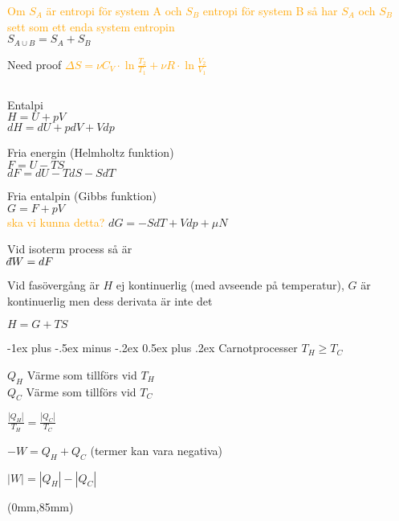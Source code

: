 \documentclass[10pt,landscape]{article}
\makeatletter
\renewcommand{\section}{\@startsection{section}{1}{0mm}%
                                {-1ex plus -.5ex minus -.2ex}%
                                {0.5ex plus .2ex}%
                                {\normalfont\large\bfseries}
                                }
\def\dbar{{\mathchar'26\mkern-12mu d}}
\makeatother
\begin{document}
\begin{multicols}{5}
\textcolor{orange}{Om $S_A$ är entropi för system A och $S_B$ entropi för system B så har
$S_A$ och $S_B$ sett som ett enda system entropin}\\
$S_{A \cup B} = S_A + S_B$

Need proof
\textcolor{orange}{
$\Delta S = \nu C_V \cdot \ln \frac{T_2}{T_1} + \nu R \cdot \ln \frac{V_2}{V_1}$
}

$$$$

Entalpi\\
$H = U + pV$\\
$dH = dU + pdV + Vdp$

Fria energin (Helmholtz funktion)\\
$F = U -TS$\\
$dF = dU - TdS - SdT$

Fria entalpin (Gibbs funktion)\\
$G = F + pV$\\
\textcolor{orange}{ska vi kunna detta?}
$dG = -SdT + Vdp + \mu N$

$$$$
Vid isoterm process så är\\
$\dbar W = dF$

Vid fasövergång är $H$ ej kontinuerlig (med avseende på temperatur), $G$ är kontinuerlig men dess derivata är inte det

$H = G + TS$

\section{Carnotprocesser}
$T_H \ge T_C$

$Q_H$ Värme som tillförs vid $T_H$\\
$Q_C$ Värme som tillförs vid $T_C$

$\frac{|Q_H|}{T_H} = \frac{|Q_C|}{T_C}$

$-W = Q_H + Q_C$ (termer kan vara negativa)

$|W| = |Q_H| - |Q_C|$

\end{multicols}


\begin{textblock*}{299mm}(0mm,85mm)
\end{textblock*}
\end{document}
